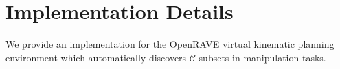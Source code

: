 %   

\section{Implementation Details}

We provide an implementation for the
OpenRAVE \citep{diankov2010openrave}
virtual kinematic planning environment
which automatically discovers $\mathcal{C}$-subsets
in manipulation tasks.


